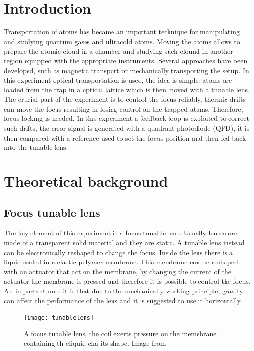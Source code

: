 \documentclass[a4paper,10pt]{article}
\begin{document}
\section{Introduction}
Transportation of atoms has became an important technique for manipulating and studying quantum gases and ultracold atoms. Moving the atoms allows to prepare the atomic cloud in a chamber and studying such clound in another region equipped with the appropriate instruments. Several approaches have been developed, such as magnetic transport or mechanically transporting the setup. In this experiment optical transportation is used, the idea is simple: atoms are loaded from the trap in a optical lattice which is then moved with a tunable lens. The crucial part of the experiment is to control the focus reliably, thermic drifts can move the focus resulting in losing control on the trapped atoms. Therefore, focus locking is needed. In this experiment a feedback loop is exploited to correct such drifts, the error signal is generated with a quadrant photodiode (QPD), it is then compared with a reference used to set the focus position and then fed back into the tunable lens.

\section{Theoretical background}
\subsection{Focus tunable lens}
The key element of this experiment is a focus tunable lens. Usually lenses are made of a transparent solid material and they are static. A tunable lens instead can be electronically reshaped to change the focus. Inside the lens there is a liquid sealed in a elastic polymer membrane. This membrane can be reshaped with an actuator that act on the membrane, by changing the current of the actuator the membrane is pressed and therefore it is possible to control the focus. An important note it is that due to the mechanically working principle, gravity can affect the performance of the lens and it is suggested to use it horizontally.
\begin{figure}[H]
\centering
\texttt{[image: tunablelens]}
\caption{A focus tunable lens, the coil exerts pressure on the memebrane containing th eliquid cha its shape. Image from \cite{lens_datasheet}}
\end{figure}
\end{document}
